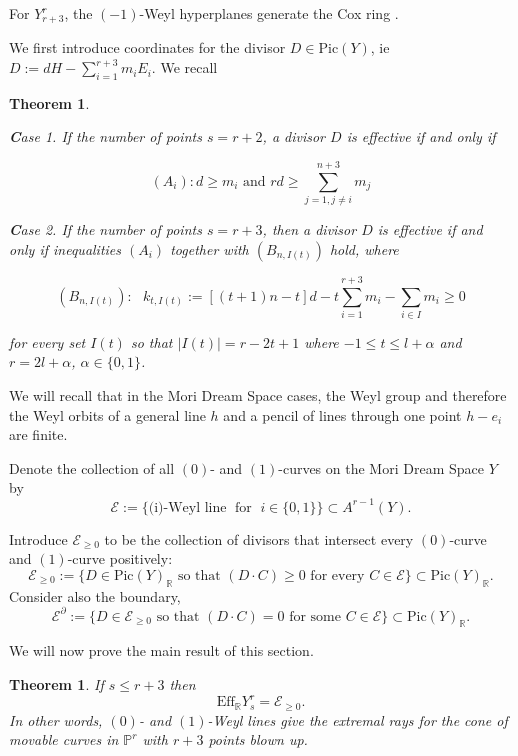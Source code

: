 \documentclass[12pt]{article}
\newtheorem{theorem}[equation]{Theorem}
\numberwithin{equation}{section}
\numberwithin{subeq}{equation}
\def\bbR{\mathbb{R}}
\begin{document}
For $Y^r_{r+3}$, the $(-1)$-Weyl hyperplanes
generate the Cox ring \cite[Theorem 1.2]{CT}.

We first introduce coordinates for the divisor $D\in \text{Pic}(Y)$, ie $D:=dH-\sum_{i=1}^{r+3} m_i E_i.$ We recall

\begin{theorem}\cite[Theorem 5.1]{bdp3}

{\textbf Case 1}. If the number of points $s=r+2$,
a divisor $D$ is effective if and only if

$$(A_{i}): d\geq m_i \text{ and } rd \geq \sum_{j=1, j\neq i}^{n+3} m_j$$

{\textbf Case 2}.  If the number of points $s=r+3$,
then a divisor $D$ is effective if and only if
inequalities $(A_{i})$ together with $(B_{n, I(t)})$ hold, where

$$(B_{n, I(t)}): \text{  }  k_{t, I(t)}:=[(t+1)n - t] d - t \sum_{i=1}^{r+3} m_i - \sum_{i\in I} m_i\geq 0$$
 
for every  set $I(t)$ so that $|I(t)|=r-2t+1$ where $-1\leq t \leq l+\alpha$ and $r=2l+\alpha$, $\alpha\in \{0, 1\}$.
\end{theorem}


We will recall  that in the Mori Dream Space cases,
the Weyl group and therefore the Weyl orbits
of a general line $h$ and a pencil of lines through one point $h-e_i$ are finite.

Denote the collection of all $(0)$- and $(1)$-curves on the Mori Dream Space $Y$ by
\begin{equation}\label{equation1}
\mathcal{E}:=\{\text{(i)-Weyl line}  \;\text{ for }\; i \in \{0,1\}\} \subset A^{r-1}(Y).
\end{equation}


Introduce $\mathcal{E}_{\geq 0}$ to be the collection of divisors
that intersect every $(0)$-curve and $(1)$-curve positively:
\[
\mathcal{E}_{\geq 0} :=
\{ D \in \text{Pic}(Y)_{\bbR} \text{ so that }  (D \cdot C) \geq 0
\text{ for every } C \in \mathcal{E} \}
\subset \text{Pic}(Y)_{\bbR}.
\]
Consider also the boundary,
\[
\mathcal{E}^{\partial} :=
\{ D\in \mathcal{E}_{\geq 0} \text{ so that }  (D \cdot C)= 0
\text{ for some } C \in \mathcal{E} \}
\subset \text{Pic}(Y)_{\bbR}.
\]




We will now prove the main result of this section.

\begin{theorem}\label{effective cone}
 If $s \leq r+3$ then
 $$\text{Eff}_{\mathbb{R}} Y^r_s = \mathcal{E}_{\geq 0}.$$
In other words, $(0)$- and $(1)$-Weyl lines give the extremal rays
for the cone of movable curves in $\mathbb{P}^r$ with $r+3$ points blown up.
\end{theorem}
\end{document}
